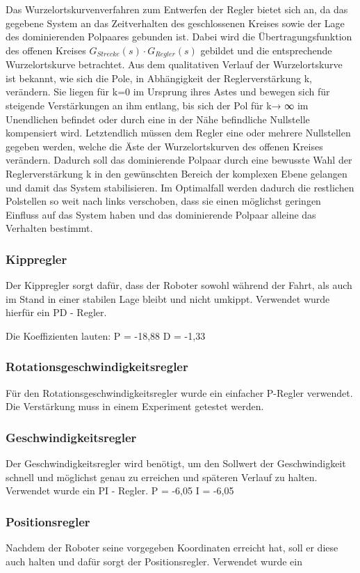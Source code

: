 Das Wurzelortskurvenverfahren zum Entwerfen der Regler bietet sich an, da das gegebene System an das Zeitverhalten des geschlossenen Kreises sowie der Lage des dominierenden Polpaares gebunden ist.  Dabei wird die Übertragungsfunktion des offenen Kreises $G_{Strecke}(s)\cdot G_{Regler}(s)$ gebildet und die entsprechende Wurzelortskurve betrachtet. Aus dem qualitativen Verlauf der Wurzelortskurve ist bekannt, wie sich die Pole, in Abhängigkeit der Reglerverstärkung k, verändern. Sie liegen für k=0 im Ursprung ihres Astes und bewegen sich für steigende Verstärkungen an ihm entlang, bis sich der Pol für k→ ∞ im Unendlichen befindet oder durch eine in der Nähe befindliche Nullstelle kompensiert wird. Letztendlich müssen dem Regler eine oder mehrere Nullstellen gegeben werden, welche die Äste der Wurzelortskurven des offenen Kreises verändern. Dadurch soll das dominierende Polpaar durch eine bewusste Wahl der Reglerverstärkung k in den gewünschten Bereich der komplexen Ebene gelangen und damit das System stabilisieren. Im Optimalfall werden dadurch die restlichen Polstellen so weit nach links verschoben, dass sie einen möglichst geringen Einfluss auf das System haben und das dominierende Polpaar alleine das Verhalten bestimmt.

\subsubsection{Kippregler}
Der Kippregler sorgt dafür, dass der Roboter sowohl während der Fahrt, als auch im Stand in einer stabilen Lage bleibt und nicht umkippt.
Verwendet wurde hierfür ein PD - Regler.

Die Koeffizienten lauten:
P = -18,88
D = -1,33
\subsubsection{Rotationsgeschwindigkeitsregler}
Für den Rotationsgeschwindigkeitsregler wurde ein einfacher P-Regler verwendet. Die Verstärkung muss in einem Experiment getestet werden.
\subsubsection{Geschwindigkeitsregler}
Der Geschwindigkeitsregler wird benötigt, um den Sollwert der Geschwindigkeit schnell und möglichst genau zu erreichen und späteren Verlauf zu halten.
Verwendet wurde ein PI - Regler.
P = -6,05
I = -6,05
\subsubsection{Positionsregler}
Nachdem der Roboter seine vorgegeben Koordinaten erreicht hat, soll er diese auch halten und dafür sorgt der Positionsregler.
Verwendet wurde ein 

